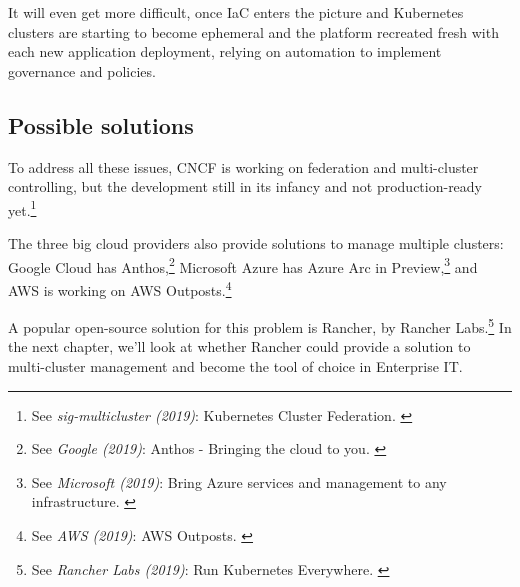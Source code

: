 It will even get more difficult, once IaC enters the picture and Kubernetes clusters are starting to become ephemeral and the platform recreated fresh with each new application deployment, relying on automation to implement governance and policies.

\subsection{Possible solutions}

To address all these issues, CNCF is working on federation and multi-cluster controlling, but the development still in its infancy and not production-ready yet.\footnote{See \textit{sig-multicluster (2019)}: Kubernetes Cluster Federation. \cite{kubeFed}}

The three big cloud providers also provide solutions to manage multiple clusters: Google Cloud has Anthos,\footnote{See \textit{Google (2019)}: Anthos - Bringing the cloud to you. \cite{googleAnthos}} Microsoft Azure has Azure Arc in Preview,\footnote{See \textit{Microsoft (2019)}: Bring Azure services and management to any infrastructure. \cite{azureArc}} and AWS is working on AWS Outposts.\footnote{See \textit{AWS (2019)}: AWS Outposts. \cite{awsOutposts}}

A popular open-source solution for this problem is Rancher, by Rancher Labs.\footnote{See \textit{Rancher Labs (2019)}: Run Kubernetes Everywhere. \cite{rancher}} In the next chapter, we'll look at whether Rancher could provide a solution to multi-cluster management and become the tool of choice in Enterprise IT.
